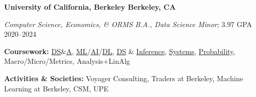 \textbf{University of California, Berkeley \hfill Berkeley, CA} \par
\textit{Computer Science, Economics, \& ORMS B.A., Data Science Minor}; 3.97 GPA \hfill 2020--2024\par
\textbf{Coursework:} \href{https://sp23.datastructur.es/}{DS}\&\href{https://cs170.org/}{A}, \href{https://www.eecs189.org/}{ML}/\href{https://inst.eecs.berkeley.edu/~cs188/fa22/}{AI}/\href{https://inst.eecs.berkeley.edu/~cs182/sp23/}{DL}, \href{https://ds100.org/}{DS} \& \href{https://data102.org/fa22/}{Inference}, \href{https://inst.eecs.berkeley.edu/~cs61c/fa22/}{Systems}, \href{https://www.stat134.org/}{Probability}, Macro/Micro/Metrics, Analysis+LinAlg \par
\textbf{Activities \& Societies:} Voyager Consulting, Traders at Berkeley, Machine Learning at Berkeley, CSM, UPE
